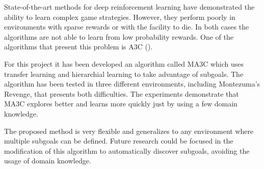 
State-of-the-art methods for deep reinforcement learning have demonstrated the ability to learn complex game strategies.
However, they perform poorly in environments with sparse rewards or with the facility to die.
In both cases the algorithms are not able to learn from low probability rewards.
One of the algorithms that present this problem is \acf{A3C} (\cite{mnih2016A3C}).

For this project it has been developed an algorithm called \acf{MA3C} which uses transfer learning and hierarchial learning
to take advantage of subgoals.
The algorithm has been tested in three different environments, including Montezuma's Revenge, that presents both difficulties.
The experiments demonstrate that \ac{MA3C} explores better and learns more quickly just by using a few domain knowledge.

The proposed method is very flexible and generalizes to any environment where multiple subgoals can be defined.
Future research could be focused in the modification of this algorithm to automatically discover subgoals,
avoiding the usage of domain knowledge.

